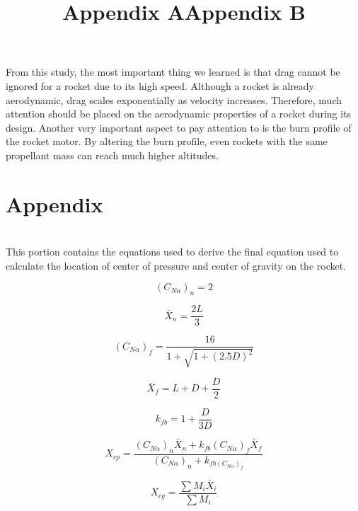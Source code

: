 \documentclass{report}
\begin{document}
\noindent From this study, the most important thing we learned is that drag cannot be ignored for a rocket due to its high speed.
Although a rocket is already aerodynamic, drag scales exponentially as velocity increases.
Therefore, much attention should be placed on the aerodynamic properties of a rocket during its design.
Another very important aspect to pay attention to is the burn profile of the rocket motor. 
By altering the burn profile, even rockets with the same propellant mass can reach much higher altitudes.

\newpage
\section*{Appendix}

\title{Appendix A}\\

\noindent This portion contains the equations used to derive the final equation used to calculate the location of center of pressure and center of gravity on the rocket.

\begin{equation*}
    (C_{N\alpha})_n=2
\end{equation*}

\begin{equation*}
    \bar{X}_n = \frac{2L}{3}
\end{equation*}

\begin{equation*}
    (C_{N\alpha})_f = \frac{16}{1+\sqrt{1+(2.5D)^2}}
\end{equation*}

\begin{equation*}
    \bar{X}_f = L+D+\frac{D}{2}
\end{equation*}

\begin{equation*}
    k_{fb} = 1 + \frac{D}{3D}
\end{equation*}

\begin{equation*}
    X_{cp} = \frac{(C_{N\alpha})_n\bar{X}_n + k_{fb}(C_{N\alpha})_f\bar{X}_f}{(C_{N\alpha})_n+k_{fb(C_{N\alpha})_f}}
\end{equation*}

\begin{equation*}
    X_{cg} = \frac{\sum M_i \bar{X}_i}{\sum M_i}
\end{equation*}

\newpage
\title{Appendix B}\\
\end{document}
